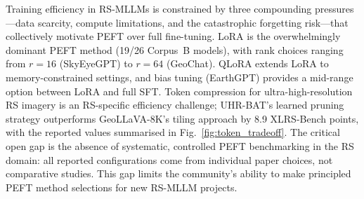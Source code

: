 Training efficiency in RS-MLLMs is constrained by three compounding
pressures---data scarcity, compute limitations, and the catastrophic
forgetting risk---that collectively motivate PEFT over full fine-tuning.
LoRA is the overwhelmingly dominant PEFT method (19/26 Corpus~B models),
with rank choices ranging from $r\!=\!16$ (SkyEyeGPT) to $r\!=\!64$
(GeoChat). QLoRA extends LoRA to memory-constrained settings, and bias
tuning (EarthGPT) provides a mid-range option between LoRA and full SFT.
Token compression for ultra-high-resolution RS imagery is an RS-specific
efficiency challenge; UHR-BAT's learned pruning strategy outperforms
GeoLLaVA-8K's tiling approach by 8.9 XLRS-Bench points, with the
reported values summarised in Fig.~\ref{fig:token_tradeoff}. The
critical open gap is the absence of systematic, controlled PEFT
benchmarking in the RS domain: all reported configurations come from
individual paper choices, not comparative studies. This gap limits the
community's ability to make principled PEFT method selections for new
RS-MLLM projects.
